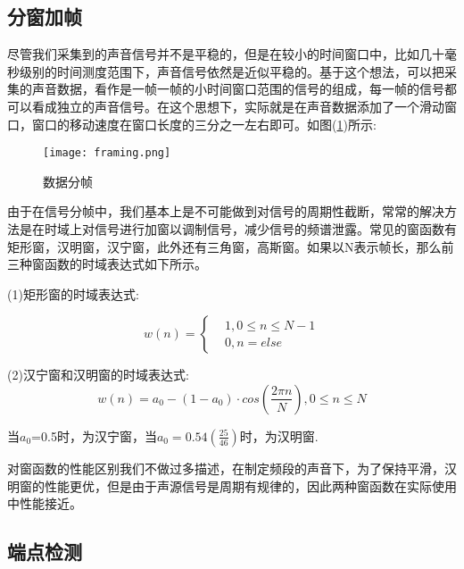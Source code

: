 \documentclass[winfonts,oneside]{njuthesis}
\begin{document}
		\subsection{分窗加帧}
		
			尽管我们采集到的声音信号并不是平稳的，但是在较小的时间窗口中，比如几十毫秒级别的时间测度范围下，声音信号依然是近似平稳的。基于这个想法，可以把采集的声音数据，看作是一帧一帧的小时间窗口范围的信号的组成，每一帧的信号都可以看成独立的声音信号。在这个思想下，实际就是在声音数据添加了一个滑动窗口，窗口的移动速度在窗口长度的三分之一左右即可。如图(\ref{fig: framing})所示:
					
			\begin{figure}[H]
				\centering
				\texttt{[image: framing.png]} 
				\caption{数据分帧}
				\label{fig: framing}
			\end{figure}
		
			由于在信号分帧中，我们基本上是不可能做到对信号的周期性截断，常常的解决方法是在时域上对信号进行加窗以调制信号，减少信号的频谱泄露。常见的窗函数有矩形窗，汉明窗，汉宁窗，此外还有三角窗，高斯窗\cite{Window_function}。如果以N表示帧长，那么前三种窗函数的时域表达式如下所示。
			
			(1)矩形窗的时域表达式:
			
			\begin{equation}
				w(n)=\left\{
				\begin{aligned}
					&1, 0\leq n \leq N - 1\\
					&0, n = else
				\end{aligned}
				\right.
			\end{equation}
			
			
			(2)汉宁窗和汉明窗的时域表达式:
			\begin{equation}
				w(n)=a_0-(1-a_0)\cdot cos(\frac{2\pi n}{N}), 0 \leq n \leq N
			\end{equation}
			
			当$a_0$=0.5时，为汉宁窗，当$a_0=0.54(\frac{25}{46})$时，为汉明窗.
			
			对窗函数的性能区别我们不做过多描述，在制定频段的声音下，为了保持平滑，汉明窗的性能更优，但是由于声源信号是周期有规律的，因此两种窗函数在实际使用中性能接近。
			
			
		\subsection{端点检测}
		
\end{document}
